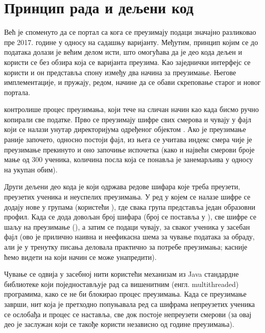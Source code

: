 \section{Принцип рада и дељени код}

Већ је споменуто да се портал са кога се преузимају подаци значајно разликовао пре 2017. године у односу на садашњу варијанту. Међутим, принцип којим се до података долази је већим делом исти, што омогућава да је део кода дељен и користи се без обзира која се варијанта преузима. Као заједнички интерфејс се користи  и он представља спону између два начина за преузимање. Његове имплементације,  и  пружају, редом, начине да се обави скреповање старог и новог портала.

 контролише процес преузимања, који тече на сличан начин као када бисмо ручно копирали све податке. Прво се преузимају шифре свих смерова и чувају у фајл  који се налази унутар директоријума одређеног  објектом . Ако је преузимање раније започето, односно постоји  фајл, из њега се учитава индекс смера чије је преузимање прекинуто и оно започиње испочетка (како и највећи смерови броје мање од 300 ученика, количина посла која се понавља је занемарљива у односу на укупан обим). 

Други дељени део кода је  који одржава редове шифара које треба преузети, преузетих ученика и неуспелих преузимања. У ред у којем се налазе шифре се додају нове у групама (користећи ), где свака група представља један образовни профил. Када се дода довољан број шифара (број се поставља у ), све шифре се шаљу на преузимање (), а затим се подаци чувају, за сваког ученика у засебан фајл (ово је прилично наивна и неефикасна шема за чување података за обраду, али је у тренутку писања деловала практично за потребе преузимања; касније ћемо видети на који начин се може унапредити). 

Чување се одвија у засебној нити користећи  механизам из Java стандардне библиотеке који поједностављује рад са вишенитним (енгл. multithreaded) програмима, како се не би блокирао процес преузимања. Када се преузимање заврши, нит која је претходно попуњавала ред са шифрама непреузетих ученика се ослобађа и процес се наставља, све док постоје непреузети смерови (за овај део је заслужан  који се такође користи независно од године преузимања).



